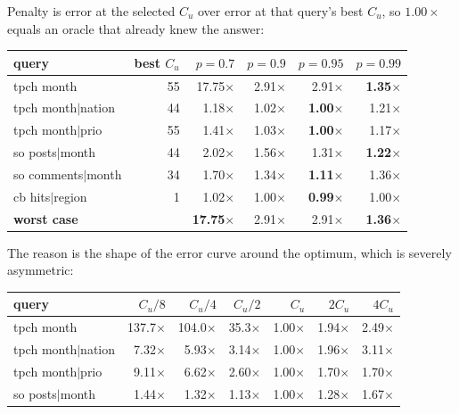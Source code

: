 \documentclass[11pt,a4paper]{article}
\newcommand{\lose}{\color{red}}
\newcommand{\Cu}{C_u}
\begin{document}
Penalty is error at the selected $\Cu$ over error at that query's best $\Cu$, so $1.00\times$ equals
an oracle that already knew the answer:

\begin{center}\small
\begin{tabular}{lrrrrr}
\toprule
query & best $\Cu$ & $p{=}0.7$ & $p{=}0.9$ & $p{=}0.95$ & $p{=}0.99$ \\
\midrule
tpch month           & 55 & \lose 17.75$\times$ & 2.91$\times$ & 2.91$\times$ & \textbf{1.35$\times$} \\
tpch month$|$nation  & 44 & 1.18$\times$ & 1.02$\times$ & \textbf{1.00$\times$} & 1.21$\times$ \\
tpch month$|$prio    & 55 & 1.41$\times$ & 1.03$\times$ & \textbf{1.00$\times$} & 1.17$\times$ \\
so posts$|$month     & 44 & 2.02$\times$ & 1.56$\times$ & 1.31$\times$ & \textbf{1.22$\times$} \\
so comments$|$month  & 34 & 1.70$\times$ & 1.34$\times$ & \textbf{1.11$\times$} & 1.36$\times$ \\
cb hits$|$region     &  1 & 1.02$\times$ & 1.00$\times$ & \textbf{0.99$\times$} & 1.00$\times$ \\
\midrule
\textbf{worst case} & & \textbf{17.75$\times$} & 2.91$\times$ & 2.91$\times$ & \textbf{1.36$\times$} \\
\bottomrule
\end{tabular}
\end{center}

The reason is the shape of the error curve around the optimum, which is severely asymmetric:

\begin{center}\small
\begin{tabular}{lrrrrrr}
\toprule
query & $\Cu/8$ & $\Cu/4$ & $\Cu/2$ & $\Cu$ & $2\Cu$ & $4\Cu$ \\
\midrule
tpch month          & 137.7$\times$ & 104.0$\times$ & \lose 35.3$\times$ & 1.00$\times$ & 1.94$\times$ & 2.49$\times$ \\
tpch month$|$nation & 7.32$\times$ & 5.93$\times$ & 3.14$\times$ & 1.00$\times$ & 1.96$\times$ & 3.11$\times$ \\
tpch month$|$prio   & 9.11$\times$ & 6.62$\times$ & 2.60$\times$ & 1.00$\times$ & 1.70$\times$ & 1.70$\times$ \\
so posts$|$month    & 1.44$\times$ & 1.32$\times$ & 1.13$\times$ & 1.00$\times$ & 1.28$\times$ & 1.67$\times$ \\
\bottomrule
\end{tabular}
\end{center}
\end{document}
